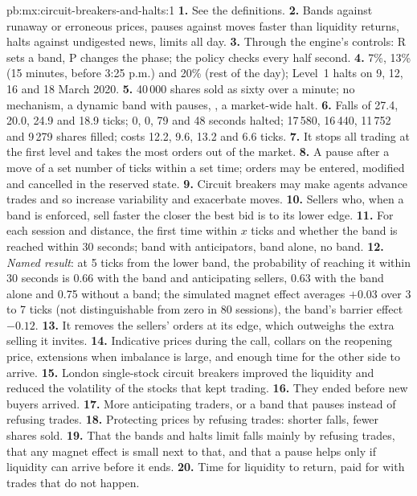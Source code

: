 \begin{solution}{pb:mx:circuit-breakers-and-halts:1}
\textbf{1.} See the definitions.
\textbf{2.} Bands against runaway or erroneous prices, pauses against moves faster than liquidity returns, halts against undigested news, limits all day.
\textbf{3.} Through the engine's controls: R sets a band, P changes the phase; the policy checks every half second.
\textbf{4.} 7\%, 13\% (15 minutes, before 3:25 p.m.) and 20\% (rest of the day); Level~1 halts on 9, 12, 16 and 18 March 2020.
\textbf{5.} 40\,000 shares sold as sixty  over a minute; no mechanism, a dynamic band with pauses, , a market-wide halt.
\textbf{6.} Falls of 27.4, 20.0, 24.9 and 18.9 ticks; 0, 0, 79 and 48 seconds halted; 17\,580, 16\,440, 11\,752 and 9\,279 shares filled; costs 12.2, 9.6,
13.2 and 6.6 ticks.
\textbf{7.} It stops all trading at the first level and takes the most orders out of the market.
\textbf{8.} A pause after a move of a set number of ticks within a set time; orders may be entered, modified and cancelled in the reserved state.
\textbf{9.} Circuit breakers may make agents advance trades and so increase variability and exacerbate moves.
\textbf{10.} Sellers who, when a band is enforced, sell faster the closer the best bid is to its lower edge.
\textbf{11.} For each session and distance, the first time within $x$ ticks and whether the band is reached within 30 seconds; band with anticipators,
band alone, no band.
\textbf{12.} \emph{Named result}: at 5 ticks from the lower band, the probability of reaching it within 30 seconds is 0.66 with the band and
anticipating sellers, 0.63 with the band alone and 0.75 without a band; the simulated magnet effect averages $+0.03$ over 3 to 7 ticks (not
distinguishable from zero in 80 sessions), the band's barrier effect $-0.12$.
\textbf{13.} It removes the sellers' orders at its edge, which outweighs the extra selling it invites.
\textbf{14.} Indicative prices during the call, collars on the reopening price, extensions when imbalance is large, and enough time for the other side
to arrive.
\textbf{15.} London single-stock circuit breakers improved the liquidity and reduced the volatility of the stocks that kept trading.
\textbf{16.} They ended before new buyers arrived.
\textbf{17.} More anticipating traders, or a band that pauses instead of refusing trades.
\textbf{18.} Protecting prices by refusing trades: shorter falls, fewer shares sold.
\textbf{19.} That the bands and halts limit falls mainly by refusing trades, that any magnet effect is small next to that, and that a pause helps only if
liquidity can arrive before it ends.
\textbf{20.} Time for liquidity to return, paid for with trades that do not happen.
\end{solution}

